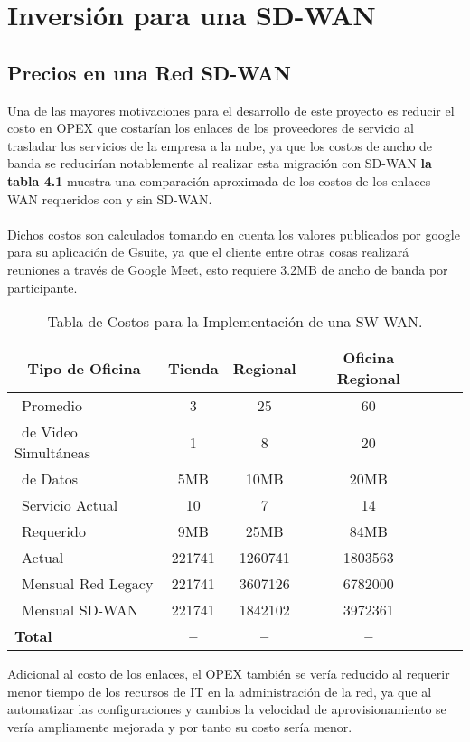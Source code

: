\chapter{Inversión para una SD-WAN}
\label{cha:Inversión para una SD-WAN}

\section{Precios en una Red SD-WAN} %
\label{sec:Precios en una Red SD-WAN}

Una de las mayores motivaciones para el desarrollo de este proyecto es reducir el costo en OPEX que costarían los enlaces de los proveedores de servicio al trasladar los servicios de la empresa a la nube, ya que los costos de ancho de banda se reducirían notablemente al realizar esta migración con SD-WAN \textbf{la tabla 4.1} muestra una comparación aproximada de los costos de los enlaces WAN requeridos con y sin SD-WAN. 
\\
\\
Dichos costos son calculados tomando en cuenta los valores publicados por google para su aplicación de Gsuite, ya que el cliente entre otras cosas realizará reuniones a través de Google Meet, esto requiere 3.2MB de ancho de banda por participante.

\begin{table}[ht]
	\caption{Tabla de Costos  para la Implementación de una SW-WAN.}
	\label{tab:hla:results}
\centering
\begin{tabular}{lccccc}
	\toprule
	\multicolumn{1}{c}{\textbf{Tipo de Oficina}} 	& \textbf{Tienda}	& \textbf{Regional}	& \textbf{Oficina Regional}\\
	\midrule
\cite{Usuarios}~Promedio 		& 3 & 25 & 60	 \\
\cite{Sesiones}~de Video Simultáneas & 1& 8	& 20	\\
\cite{Trafico}~de Datos	& 5MB	& 10MB	& 20MB	\\
\cite{BW}~Servicio Actual		& 10& 7	& 14	 \\
\cite{BW}~Requerido	& 9MB	& 25MB	& 84MB	 \\
\cite{Costo}~Actual			& 221741	& 1260741	& 1803563	\\
\cite{Costo}~Mensual Red Legacy		& 221741	& 3607126	& 6782000 \\
\cite{Costo}~Mensual SD-WAN	& 221741	& 1842102	& 3972361\\
	\midrule
	\textbf{Total}			& \textbf{--}		& \textbf{--}		& \textbf{--} \\
	\bottomrule
\end{tabular}
\end{table}
Adicional al costo de los enlaces, el OPEX también se vería reducido al requerir menor tiempo de los recursos de IT en la administración de la red, ya que al automatizar las configuraciones y cambios la velocidad de aprovisionamiento se vería ampliamente mejorada y por tanto su costo sería menor.


